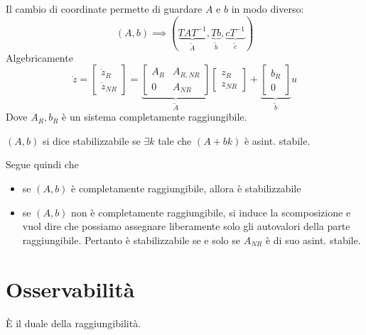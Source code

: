 Il cambio di coordinate permette di guardare $A$ e $b$ in modo diverso:
\begin{equation*}
	(A,b)\implies \left(\underbrace{TAT^{-1}}_{\tilde{A}} ,\underbrace{Tb}_{\tilde{b}} ,\underbrace{cT^{-1}}_{\tilde{c}}\right)
\end{equation*}
Algebricamente
\begin{equation*}
	\dot{z} =\begin{bmatrix}
	\dot{z}_R\\
	\dot{z}_{NR}
	\end{bmatrix} =\underbrace{\begin{bmatrix}
		A_R & A_{R,NR}\\
		0 & A_{NR}
		\end{bmatrix}
		}_{\tilde{A}}\begin{bmatrix}
	z_R\\
	z_{NR}
	\end{bmatrix} +\underbrace{\begin{bmatrix}
		b_R\\
		0
		\end{bmatrix}
		}_{\tilde{b}} u
\end{equation*}
Dove $A_R ,b_R$ è un sistema completamente raggiungibile.
\begin{defn}
	$(A,b)$ si dice stabilizzabile se $\exists k$ tale che $(A+bk)$ è asint. stabile.
\end{defn}
Segue quindi che
\begin{itemize}
	\item se $(A,b)$ è completamente raggiungibile, allora è stabilizzabile
	\item se $(A,b)$ non è completamente raggiungibile, si induce la scomposizione e vuol dire che possiamo assegnare liberamente solo gli autovalori della parte raggiungibile. Pertanto è stabilizzabile se e solo se $A_{NR}$ è di suo asint. stabile.
\end{itemize}

\chapter{Osservabilità}

È il duale della raggiungibilità.

